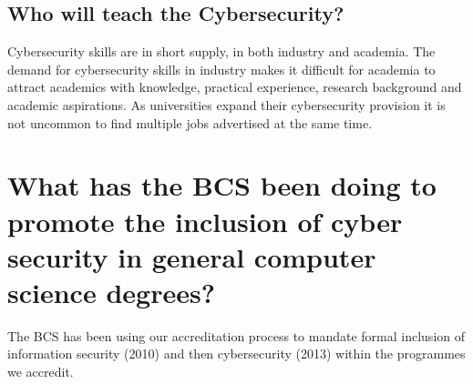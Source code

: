 \documentclass[a4paper,11pt]{article}
\begin{document}
\subsection*{Who will teach the Cybersecurity?}\label{sec:staffing}

Cybersecurity skills are in short supply, in both industry and academia. The demand for cybersecurity skills in industry makes it difficult for academia to attract academics with knowledge, practical experience, research background and academic aspirations. As universities expand their cybersecurity provision it is not uncommon to find multiple jobs advertised at the same time. 

\section*{What has the BCS been doing to promote the inclusion of cyber security in general computer science degrees? }

 The BCS has been using our accreditation process to mandate formal inclusion of information security (2010) and then cybersecurity (2013) within the programmes we accredit. 

\end{document}

